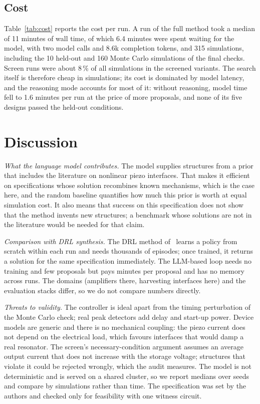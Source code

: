 \documentclass[journal]{IEEEtran}
\begin{document}
\subsection{Cost}
Table~\ref{tab:cost} reports the cost per run. A run of
the full method took a median of 11 minutes of wall time, of which 6.4 minutes were spent waiting for the
model, with two model calls and 8.6k completion tokens, and 315 simulations, including the 10 held-out
and 160 Monte Carlo simulations of the final checks. Screen runs were about 8\,\% of all simulations in the
screened variants. The search itself is therefore cheap in simulations; its cost is dominated by model
latency, and the reasoning mode accounts for most of it: without reasoning, model time fell to 1.6 minutes
per run at the price of more proposals, and none of its five designs passed the held-out conditions.

\begin{table}[t]
\centering\footnotesize
\caption{Cost per run: medians of wall time, model time, model calls and simulations; mean completion
tokens.}\label{tab:cost}
\resizebox{\columnwidth}{!}{}
\end{table}

\section{Discussion}\label{sec:discussion}
\emph{What the language model contributes.} The model supplies structures from a prior that includes
the literature on nonlinear piezo interfaces. That makes it efficient on specifications whose solution
recombines known mechanisms, which is the case here, and the random baseline quantifies how much this
prior is worth at equal simulation cost. It also means that success on this specification does not show
that the method invents new structures; a benchmark whose solutions are not in the literature would be
needed for that claim.

\emph{Comparison with DRL synthesis.} The DRL method of~\cite{zhao2022drl} learns a policy from scratch
within each run and needs thousands of episodes; once trained, it returns a solution for the same
specification immediately. The LLM-based loop needs no training and few proposals but pays minutes per
proposal and has no memory across runs. The domains (amplifiers there, harvesting interfaces here) and
the evaluation stacks differ, so we do not compare numbers directly.

\emph{Threats to validity.} The controller is ideal apart from the timing perturbation of the Monte
Carlo check; real peak detectors add delay and start-up power. Device models are generic and there is no
mechanical coupling: the piezo current does not depend on the electrical load, which favours
interfaces that would damp a real resonator. The screen's necessary-condition argument assumes an
average output current that does not increase with the storage voltage; structures that violate it
could be rejected wrongly, which the audit measures. The model is not deterministic and is served on a
shared cluster, so we report medians over seeds and compare by simulations rather than time. The
specification was set by the authors and checked only for feasibility with one witness circuit.
\end{document}
